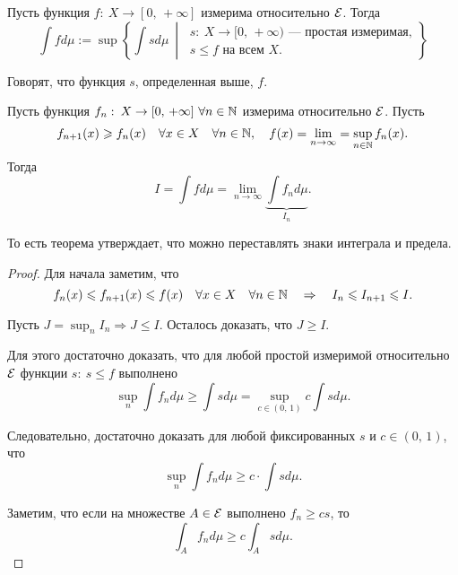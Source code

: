 \begin{definition}
    Пусть функция $f:\: X\to[0,\, +\infty]$ измерима относительно $\mathcal{E}$. Тогда \[
        \int fd\mu:=\sup\left\{\int sd\mu\ \middle|\ \begin{array}{l}
            s:\: X\to[0,\, +\infty)\text{~--- простая измеримая,} \\
            s\leqslant f\text{ на всем } X.
        \end{array} \right\}
    \]

    \begin{remark}
        Говорят, что функция $s$, определенная выше,  $f$.
    \end{remark}
\end{definition}

\begin{theorem}
    Пусть функция $f_n:\: X\to[0,\, +\infty]\ \forall n\in\N$ измерима относительно $\mathcal{E}$.
    Пусть \[
        f_{n+1}(x)\geqslant f_n(x)\quad \forall x\in X\quad \forall n\in\mathbb{N},
        \quad f(x)=\lim_{n\to\infty}=\sup_{n\in\mathbb{N}} f_n(x).
    \]
    Тогда \[
        I=\int fd\mu=\lim_{n\to\infty}\underbrace{\int f_nd\mu}_{I_n}.
    \]

    \begin{remark}
        То есть теорема утверждает, что можно переставлять знаки интеграла и предела.
    \end{remark}

    \begin{proof}

        Для начала заметим, что \[
            f_n(x)\leqslant f_{n+1}(x)\leqslant f(x)\quad\forall x\in X\quad \forall n\in\mathbb{N}\quad
            \Rightarrow \quad I_{n}\leqslant I_{n+1}\leqslant I.
        \]

        Пусть $J=\sup_{n}I_n\Rightarrow J\leqslant I$. Осталось доказать, что $J\geqslant I$.

        Для этого достаточно доказать, что для любой простой измеримой относительно $\mathcal{E}$ функции $s:\: s\leqslant f$
        выполнено \[
            \sup_{n}\int f_nd\mu\geqslant\int sd\mu=\sup_{c\in(0,\, 1)}c\int sd\mu.
        \]

        Следовательно, достаточно доказать для любой фиксированных $s$ и $c\in(0,\, 1)$, что \[
            \sup_{n}\int f_n d\mu\geqslant c\cdot\int sd\mu.
        \]

        Заметим, что если на множестве $A\in\mathcal{E}$ выполнено $f_n\geqslant cs$, то \[
            \int_A f_nd\mu\geqslant c\int_A sd\mu.
        \]


\end{proof}
\end{theorem}
